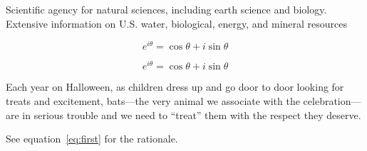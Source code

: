 \documentclass[11pt]{article}
\begin{document}
Scientific agency for natural sciences, including earth science and biology. Extensive information on U.S. water, biological, energy, and mineral resources

\begin{equation}
e^{i\theta}=\cos \theta + i \sin \theta
\label{eq:first}
\end{equation}

\begin{equation}
e^{i\theta}=\cos \theta + i \sin \theta   \label{eq:first} \end{equation}



Each year on Halloween, as children dress up and go door to door looking for treats and excitement, bats---the very animal we associate with the celebration---are in serious trouble and we need to ``treat'' them with the respect they deserve.

See equation~\ref{eq:first} for the rationale.
\end{document}
